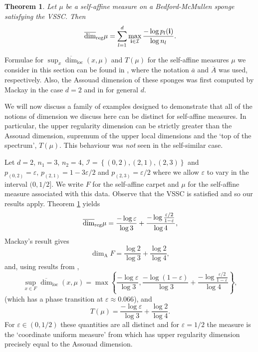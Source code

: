 \documentclass[12pt]{amsart}
\numberwithin{equation}{section}
\newtheorem{thm}{Theorem}[section]
\renewcommand{\r}{\overline{\dim}_{\textup{reg}} \mu}
\renewcommand{\epsilon}{\varepsilon}
\begin{document}
\begin{thm}\label{carpet}
Let $\mu$ be a self-affine measure on a Bedford-McMullen sponge satisfying the VSSC.  Then
\[
\r =\sum_{l=1}^d \max_{\mathbf{i}\in \mathcal{I}}\frac{-\log p_l(\mathbf{i})}{\log n_l}.
\]
\end{thm}




Formulae for $\sup_x \overline{\dim}_{\text{loc}}(x,\mu)$ and $T(\mu)$ for the self-affine measures $\mu$ we consider in this section can be found in \cite{sponges}, where the notation $\overline{a}$ and $\overline{A}$ was used, respectively.    Also, the Assouad dimension of these sponges was first computed by Mackay \cite{mackay} in the case $d=2$ and in \cite{fraser-howroyd} for general $d$.

We will now discuss a family of examples designed to demonstrate that all of the notions of dimension we discuss here can be distinct for self-affine measures.  In particular, the upper regularity dimension can be strictly greater than the Assouad dimension, supremum of the upper local dimensions and the `top of the spectrum', $T(\mu)$.  This behaviour was \emph{not} seen in the self-similar case.

Let $d=2$, $n_1=3$, $n_2=4$,  $\mathcal{I}=\left\{(0,2),(2,1),(2,3)\right\}$ and $p_{(0,2)}=\epsilon,\, p_{(2,1)}=1-3\epsilon/2$ and $p_{(2,3)}=\epsilon/2$ where we allow $\epsilon$ to vary in the interval $(0,1/2]$.  We write $F$ for the self-affine carpet and $\mu$ for the self-affine measure associated with this data.  Observe that the VSSC is satisfied and so our results apply.  Theorem \ref{carpet} yields
\[
\r = \frac{-\log \epsilon}{\log 3}+ \frac{-\log \frac{\epsilon/2}{1-\epsilon} }{\log 4},
\]
Mackay's result \cite{mackay} gives
\[
\dim_{\text{A}} F = \frac{\log 2}{ \log 3} + \frac{ \log 2}{ \log 4}, 
\]
and, using results from \cite{sponges},
\[
\sup_{x\in F} \overline{\dim}_{\text{loc}}(x,\mu)=\max\left\{ \frac{-\log \epsilon}{\log 3} , \frac{-\log (1-\epsilon)}{\log 3}+\frac{-\log \frac{\epsilon/2}{1-\epsilon} }{\log 4}\right\},
\]
(which has a phase transition at $\epsilon \approx 0.066$), and
\[
T(\mu)= \frac{-\log \epsilon }{\log 3} +\frac{\log 2}{\log 4} .
\]
For $\epsilon \in (0,1/2)$  these quantities are all distinct and for $\epsilon=1/2$ the measure is the `coordinate uniform measure' from \cite{fraser-howroyd} which has upper regularity dimension precisely equal to the Assouad dimension.
\end{document}
